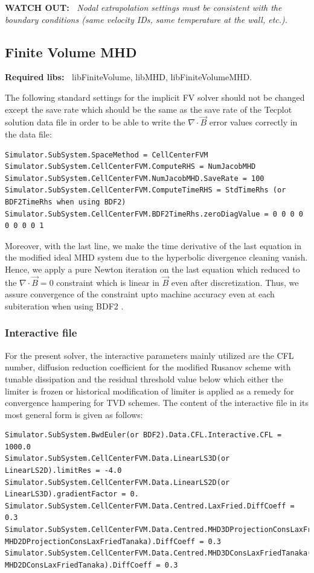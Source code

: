 \documentclass[11pt]{article}
\begin{document}
{\bf WATCH OUT:~} {\it Nodal extrapolation settings must be consistent with the boundary conditions (same velocity IDs, same temperature at the wall, etc.).}

\subsection{Finite Volume MHD}

{\bf Required libs:~} libFiniteVolume, libMHD, libFiniteVolumeMHD.

The following standard settings for the implicit FV solver should not be changed except the save rate which should be the same as the save rate of the Tecplot solution data file in order to be able to write the $\nabla\cdot\vec{B}$ error values correctly in the data file:

\begin{lstlisting}[breaklines]
Simulator.SubSystem.SpaceMethod = CellCenterFVM
Simulator.SubSystem.CellCenterFVM.ComputeRHS = NumJacobMHD
Simulator.SubSystem.CellCenterFVM.NumJacobMHD.SaveRate = 100
Simulator.SubSystem.CellCenterFVM.ComputeTimeRHS = StdTimeRhs (or BDF2TimeRhs when using BDF2)
Simulator.SubSystem.CellCenterFVM.BDF2TimeRhs.zeroDiagValue = 0 0 0 0 0 0 0 0 1
\end{lstlisting}
Moreover, with the last line, we make the time derivative of the last equation in the modified ideal MHD system due to the hyperbolic divergence cleaning vanish. Hence, we apply a pure Newton iteration on the last equation which reduced to the $\nabla\cdot\vec{B}=0$ constraint which is linear in $\vec{B}$ even after discretization. Thus, we assure convergence of the constraint upto machine accuracy even at each subiteration when using BDF2 \cite{yalim11jcp}.

\subsubsection{Interactive file}

For the present solver, the interactive parameters mainly utilized are the CFL number, diffusion reduction coefficient for the modified Rusanov scheme with tunable dissipation and the residual threshold value below which either the limiter is frozen or historical modification of limiter is applied as a remedy for convergence hampering for TVD schemes. The content of the interactive file in its most general form is given as follows:

\begin{lstlisting}[breaklines]
Simulator.SubSystem.BwdEuler(or BDF2).Data.CFL.Interactive.CFL = 1000.0
Simulator.SubSystem.CellCenterFVM.Data.LinearLS3D(or LinearLS2D).limitRes = -4.0
Simulator.SubSystem.CellCenterFVM.Data.LinearLS2D(or LinearLS3D).gradientFactor = 0.
Simulator.SubSystem.CellCenterFVM.Data.Centred.LaxFried.DiffCoeff = 0.3
Simulator.SubSystem.CellCenterFVM.Data.Centred.MHD3DProjectionConsLaxFriedTanaka(or MHD2DProjectionConsLaxFriedTanaka).DiffCoeff = 0.3
Simulator.SubSystem.CellCenterFVM.Data.Centred.MHD3DConsLaxFriedTanaka(or MHD2DConsLaxFriedTanaka).DiffCoeff = 0.3
\end{lstlisting}
\end{document}
